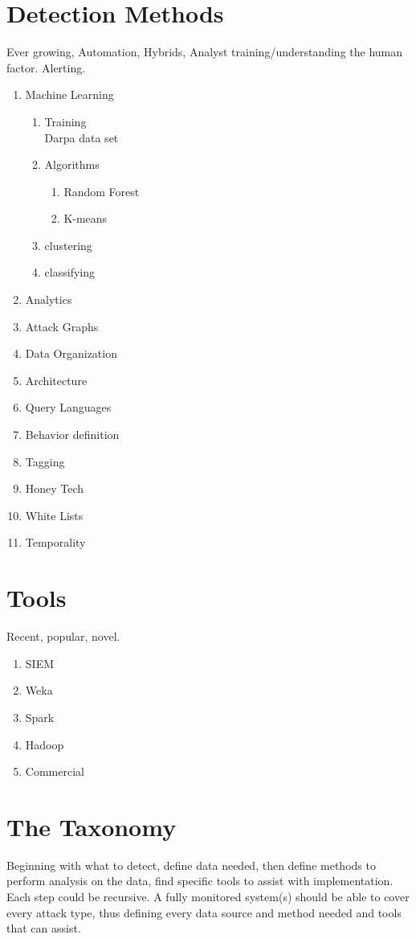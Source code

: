 \documentclass[conference]{IEEEtran}
\begin{document}
\section{Detection Methods}
Ever growing, Automation, Hybrids, Analyst training/understanding the human factor. Alerting.
\begin{enumerate}
    \item Machine Learning
    \begin{enumerate}
        \item Training\\
        Darpa data set
        \item Algorithms
        \begin{enumerate}
            \item Random Forest
            \item K-means
        \end{enumerate}
        \item clustering
        \item classifying
    \end{enumerate}
    \item Analytics
    \item Attack Graphs
    \item Data Organization
    \item Architecture
    \item Query Languages
    \item Behavior definition
    \item Tagging
    \item Honey Tech
    \item White Lists
    \item Temporality
\end{enumerate}
\vspace{5mm}
\section{Tools}
Recent, popular, novel.
\begin{enumerate}
    \item SIEM
    \item Weka
    \item Spark
    \item Hadoop
    \item Commercial
\end{enumerate}
\section{The Taxonomy}
Beginning with what to detect, define data needed, then define methods to perform analysis on the data, find specific tools to assist with implementation. Each step could be recursive. A fully monitored system(s) should be able to cover every attack type, thus defining every data source and method needed and tools that can assist. 
\end{document}
